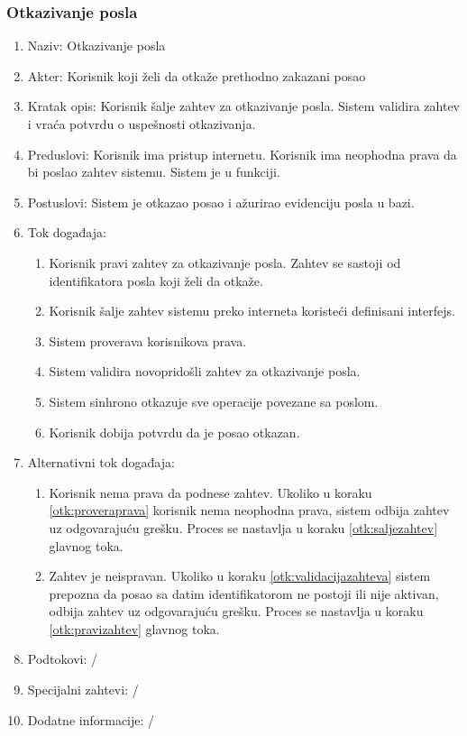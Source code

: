 \documentclass[12pt,oneside]{memoir}
\begin{document}
\subsubsection{Otkazivanje posla}
\begin{enumerate}
\item Naziv: Otkazivanje posla
\item Akter: Korisnik koji želi da otkaže prethodno zakazani posao
\item Kratak opis: Korisnik šalje zahtev za otkazivanje posla. Sistem validira zahtev i vraća potvrdu o uspešnosti otkazivanja.
\item Preduslovi: Korisnik ima pristup internetu. Korisnik ima neophodna prava da bi poslao zahtev sistemu. Sistem je u funkciji.
\item Postuslovi: Sistem je otkazao posao i ažurirao evidenciju posla u bazi.
\item Tok događaja:
	\begin{enumerate}
	\item \label{otk:pravizahtev} Korisnik pravi zahtev za otkazivanje posla. Zahtev se sastoji od identifikatora posla koji želi da otkaže.
	\item \label{otk:saljezahtev} Korisnik šalje zahtev sistemu preko interneta koristeći definisani interfejs.
	\item \label{otk:proveraprava} Sistem proverava korisnikova prava.
	\item \label{otk:validacijazahteva} Sistem validira novopridošli zahtev za otkazivanje posla.
	\item \label{otk:sinhotkazivanje} Sistem sinhrono otkazuje sve operacije povezane sa poslom.
	\item Korisnik dobija potvrdu da je posao otkazan.
	\end{enumerate}
\item Alternativni tok događaja:
	\begin{enumerate}
	\item Korisnik nema prava da podnese zahtev. Ukoliko u koraku \ref{otk:proveraprava} korisnik nema neophodna prava, sistem odbija zahtev uz odgovarajuću grešku. Proces se nastavlja u koraku \ref{otk:saljezahtev} glavnog toka.
	\item Zahtev je neispravan. Ukoliko u koraku \ref{otk:validacijazahteva} sistem prepozna da posao sa datim identifikatorom ne postoji ili nije aktivan, odbija zahtev uz odgovarajuću grešku. Proces se nastavlja u koraku \ref{otk:pravizahtev} glavnog toka.
	\end{enumerate}
\item Podtokovi: /
\item Specijalni zahtevi: /
\item Dodatne informacije: /
\end{enumerate}
\end{document}
